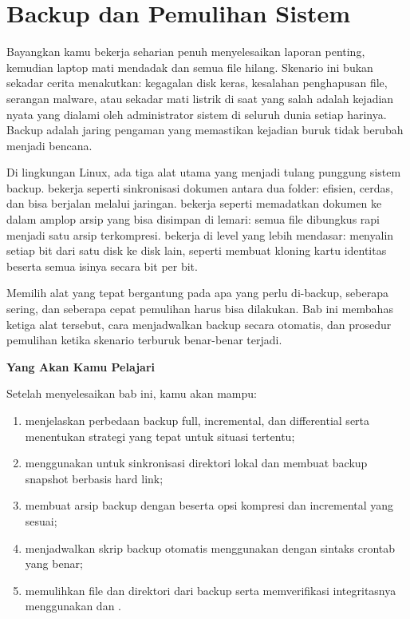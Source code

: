 
\chapter{Backup dan Pemulihan Sistem}
\label{ch:backup-and-recovery}

Bayangkan kamu bekerja seharian penuh menyelesaikan laporan penting, kemudian
laptop mati mendadak dan semua file hilang. Skenario ini bukan sekadar cerita
menakutkan: kegagalan disk keras, kesalahan penghapusan file, serangan malware,
atau sekadar mati listrik di saat yang salah adalah kejadian nyata yang dialami
oleh administrator sistem di seluruh dunia setiap harinya. Backup adalah
jaring pengaman yang memastikan kejadian buruk tidak berubah menjadi bencana.

Di lingkungan Linux, ada tiga alat utama yang menjadi tulang punggung sistem
backup.  bekerja seperti sinkronisasi dokumen antara dua folder:
efisien, cerdas, dan bisa berjalan melalui jaringan.  bekerja seperti
memadatkan dokumen ke dalam amplop arsip yang bisa disimpan di lemari: semua
file dibungkus rapi menjadi satu arsip terkompresi.  bekerja di level
yang lebih mendasar: menyalin setiap bit dari satu disk ke disk lain, seperti
membuat kloning kartu identitas beserta semua isinya secara bit per bit.

Memilih alat yang tepat bergantung pada apa yang perlu di-backup, seberapa
sering, dan seberapa cepat pemulihan harus bisa dilakukan. Bab ini membahas
ketiga alat tersebut, cara menjadwalkan backup secara otomatis, dan prosedur
pemulihan ketika skenario terburuk benar-benar terjadi.

\textbf{Yang Akan Kamu Pelajari}

Setelah menyelesaikan bab ini, kamu akan mampu:

\begin{enumerate}
    \item menjelaskan perbedaan backup full, incremental, dan differential
        serta menentukan strategi yang tepat untuk situasi tertentu;
    \item menggunakan  untuk sinkronisasi direktori lokal dan membuat
        backup snapshot berbasis hard link;
    \item membuat arsip backup dengan  beserta opsi kompresi dan
        incremental yang sesuai;
    \item menjadwalkan skrip backup otomatis menggunakan  dengan
        sintaks crontab yang benar;
    \item memulihkan file dan direktori dari backup serta memverifikasi
        integritasnya menggunakan  dan .
\end{enumerate}

